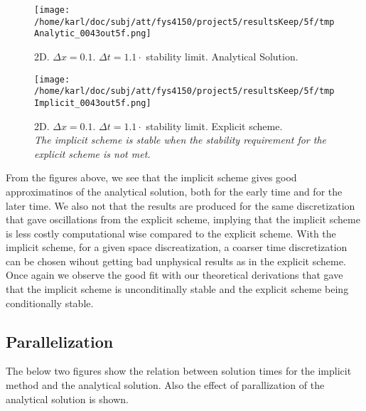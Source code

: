 \documentclass{article}
\begin{document}
\begin{minipage}{.45\textwidth} 
	\begin{figure}[H]
		\centering
		\texttt{[image: /home/karl/doc/subj/att/fys4150/project5/resultsKeep/5f/tmpAnalytic\_0043out5f.png]}
		\caption{2D. $\Delta x = 0.1$. $\Delta t = 1.1 \cdot$ stability limit.  Analytical Solution.\\ \textit{}}
		\label{fig:fig2d8}
	\end{figure}
\end{minipage}\hfill
\begin{minipage}{.45\textwidth} 
	\begin{figure}[H]
		\centering
		\texttt{[image: /home/karl/doc/subj/att/fys4150/project5/resultsKeep/5f/tmpImplicit\_0043out5f.png]}
		\caption{2D. $\Delta x = 0.1$. $\Delta t = 1.1 \cdot$ stability limit.  Explicit scheme.\\ \textit{The implicit scheme is stable when the stability requirement for the explicit scheme is not met.}}
		\label{fig:fig2d9}
	\end{figure}
\end{minipage}\hfill
\vspace{2ex}

From the figures above, we see that the implicit scheme gives good approximatinos of the analytical solution, both for the early time and for the later time. We also not that the results are produced for the same discretization that gave oscillations from the explicit scheme, implying that the implicit scheme is less costly computational wise compared to the explicit scheme. With the implicit scheme, for a given space discreatization, a coarser time discretization can be chosen wihout getting bad unphysical results as in the explicit scheme. Once again we observe the good fit with our theoretical derivations that gave that the implicit scheme is unconditinally stable and the explicit scheme being conditionally stable.


\subsection{Parallelization}
The below two figures show the relation between solution times for the implicit method and the analytical solution. Also the effect of parallization of the analytical solution is shown.
\end{document}
